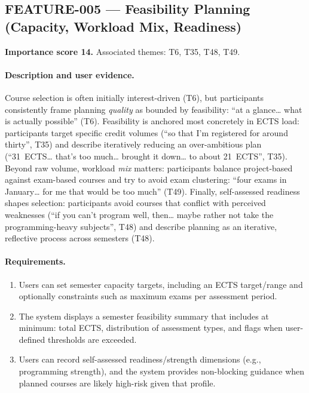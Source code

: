 \subsection{FEATURE-005 --- Feasibility Planning (Capacity, Workload Mix, Readiness)}
\label{feat:005}
\textbf{Importance score 14.} Associated themes: T6, T35, T48, T49.

\paragraph{Description and user evidence.}
Course selection is often initially interest-driven (T6), but participants consistently frame planning \emph{quality} as bounded by feasibility: \enquote{at a glance… what is actually possible} (T6). Feasibility is anchored most concretely in ECTS load: participants target specific credit volumes (\enquote{so that I'm registered for around thirty}, T35) and describe iteratively reducing an over-ambitious plan (\enquote{31~ECTS… that's too much… brought it down… to about 21~ECTS}, T35). Beyond raw volume, workload \emph{mix} matters: participants balance project-based against exam-based courses and try to avoid exam clustering: \enquote{four exams in January… for me that would be too much} (T49). Finally, self-assessed readiness shapes selection: participants avoid courses that conflict with perceived weaknesses (\enquote{if you can't program well, then… maybe rather not take the programming-heavy subjects}, T48) and describe planning as an iterative, reflective process across semesters (T48).

\paragraph{Requirements.}
\begin{enumerate}
    \item Users can set semester capacity targets, including an ECTS target/range and optionally constraints such as maximum exams per assessment period.
    \item The system displays a semester feasibility summary that includes at minimum: total ECTS, distribution of assessment types, and flags when user-defined thresholds are exceeded.
    \item Users can record self-assessed readiness/strength dimensions (e.g., programming strength), and the system provides non-blocking guidance when planned courses are likely high-risk given that profile.
\end{enumerate}

